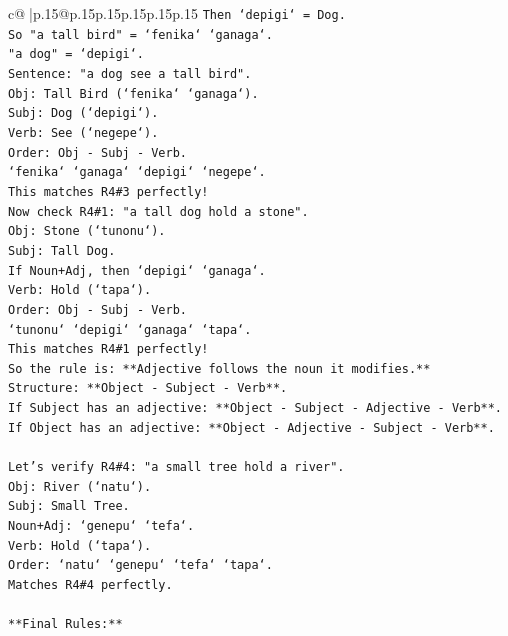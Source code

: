 \documentclass{article}
\begin{document}
{\begin{supertabular}{c@{$\;$}|p{.15\linewidth}@{}p{.15\linewidth}p{.15\linewidth}p{.15\linewidth}p{.15\linewidth}p{.15\linewidth}}
{{{\texttt{Then `depigi` = Dog.} \\
\texttt{So "a tall bird" = `fenika` `ganaga`.} \\
\texttt{"a dog" = `depigi`.} \\
\texttt{Sentence: "a dog see a tall bird".} \\
\texttt{Obj: Tall Bird (`fenika` `ganaga`).} \\
\texttt{Subj: Dog (`depigi`).} \\
\texttt{Verb: See (`negepe`).} \\
\texttt{Order: Obj {-} Subj {-} Verb.} \\
\texttt{`fenika` `ganaga` `depigi` `negepe`.} \\
\texttt{This matches R4\#3 perfectly!} \\
\texttt{Now check R4\#1: "a tall dog hold a stone".} \\
\texttt{Obj: Stone (`tunonu`).} \\
\texttt{Subj: Tall Dog.} \\
\texttt{If Noun+Adj, then `depigi` `ganaga`.} \\
\texttt{Verb: Hold (`tapa`).} \\
\texttt{Order: Obj {-} Subj {-} Verb.} \\
\texttt{`tunonu` `depigi` `ganaga` `tapa`.} \\
\texttt{This matches R4\#1 perfectly!} \\
\texttt{So the rule is: **Adjective follows the noun it modifies.**} \\
\texttt{Structure: **Object {-} Subject {-} Verb**.} \\
\texttt{If Subject has an adjective: **Object {-} Subject {-} Adjective {-} Verb**.} \\
\texttt{If Object has an adjective: **Object {-} Adjective {-} Subject {-} Verb**.} \\
\\ 
\texttt{Let's verify R4\#4: "a small tree hold a river".} \\
\texttt{Obj: River (`natu`).} \\
\texttt{Subj: Small Tree.} \\
\texttt{Noun+Adj: `genepu` `tefa`.} \\
\texttt{Verb: Hold (`tapa`).} \\
\texttt{Order: `natu` `genepu` `tefa` `tapa`.} \\
\texttt{Matches R4\#4 perfectly.} \\
\\ 
\texttt{**Final Rules:**} \\
}}}
\end{supertabular}}
\end{document}
